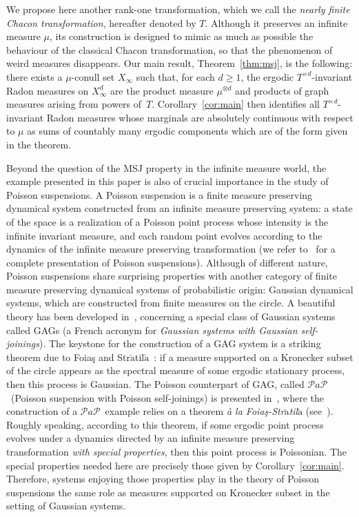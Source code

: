\documentclass[10pt]{amsart}
\theoremstyle{definition}\newtheorem{defi}[theo]{Definition}\newtheorem{rema}[theo]{Remark}\newtheorem{exam}[theo]{Example}\newtheorem{exem}[theo]{Example}\newtheorem{nota}[theo]{Notation}
\newcommand{\td}{T^{\times d}}
\newcommand{\PaP}{$\mathcal{P}a\mathcal{P}$}
\begin{document}
We propose here another rank-one transformation, which we call the \emph{nearly finite Chacon transformation}, hereafter denoted by $T$. Although it preserves an infinite measure $\mu$, its construction is designed to mimic as much as possible the behaviour of the classical Chacon transformation, so that the phenomenon of weird measures disappears. Our main result, Theorem~\ref{thm:msj}, is the following: there exists a $\mu$-conull set $X_\infty$ such that, for each $d\ge1$, the ergodic $\td$-invariant Radon measures on $X_{\infty}^d$ are the product measure $\mu^{\otimes d}$ and products of graph measures arising from powers of~$T$. Corollary~\ref{cor:main} then identifies all $\td$-invariant Radon measures whose marginals are absolutely continuous with respect to $\mu$ as sums of countably many ergodic components which are of the form given in the theorem.

Beyond the question of the MSJ property in the infinite measure world, the example presented in this paper is also of crucial importance in the study of Poisson suspensions. A Poisson suspension is a finite measure preserving dynamical system constructed from an infinite measure preserving system: a state of the space is a realization of a Poisson point process whose intensity is the infinite invariant measure, and each random point evolves according to the dynamics of the infinite measure preserving transformation (we refer to~\cite{Roy2007} for a complete presentation of Poisson suspensions). Although of different nature, Poisson suspensions share surprising properties with another category of finite measure preserving dynamical systems of probabilistic origin: Gaussian dynamical systems, which are constructed from finite measures on the circle. A beautiful theory has been developed in~\cite{LemParThou00Gausselfjoin}, concerning a special class of Gaussian systems called GAGs (a French acronym for \emph{Gaussian systems with Gaussian self-joinings}). The keystone for the construction of a GAG system is a striking theorem due to Foia\c{s} and Str$\breve{\mathrm{a}}$til$\breve{\mathrm{a}}$~\cite{FoiasStratila}: if a measure supported on a Kronecker subset of the circle appears as the spectral measure of some ergodic stationary process, then this process is Gaussian. The Poisson counterpart of GAG, called \PaP\ (Poisson suspension with Poisson self-joinings) is presented in~\cite{sushis}, where the construction of a
\PaP\ example relies on a theorem \emph{\`a la Foia\c{s}-Str$\breve{\mathrm{a}}$til$\breve{\mathrm{a}}$} (see~\cite[Theorem~3.4]{sushis}). Roughly speaking, according to this theorem, if some ergodic point process evolves under a dynamics directed by an infinite measure preserving transformation \emph{with special properties}, then this point process is Poissonian. The special properties needed here are precisely those given by Corollary~\ref{cor:main}. Therefore, systems enjoying those properties play in the theory of Poisson suspensions the same role as measures supported on Kronecker subset in the setting of Gaussian systems.
\end{document}
